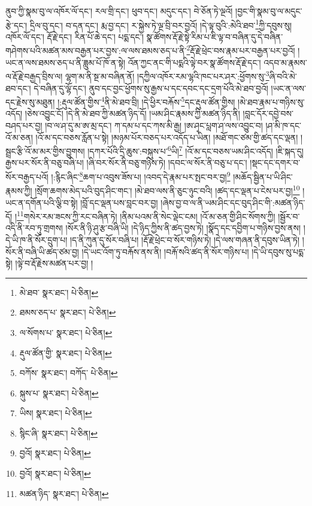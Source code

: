 ནུབ་ཀྱི་སྣམ་བུ་ལ་འཁོར་ལོ་དང་། རལ་གྲི་དང་། ཕུབ་དང་། མདུང་དང་། བེ་ཅོན་ཏེ་ལྔའོ། །བྱང་གི་སྣམ་བུ་ལ་མདུང་རྩེ་དང་། དྲིལ་བུ་དང་། བ་དན་དང་། རྨ་བྱ་དང་། ར་སྐྱེས་ཏེ་ལྔ་བྲི་བར་བྱའོ། །དེ་ལྟ་བུའི་:མེའི་ཐབ་\footnote{མེ་ཐབ་  སྣར་ཐང་།  པེ་ཅིན། }ཀྱི་དབུས་སུ། འཁོར་ལོ་དང་། རྡོ་རྗེ་དང་། རིན་པོ་ཆེ་དང་། པདྨ་དང་། སྣ་ཚོགས་རྡོ་རྗེ་སྟེ་རིམ་པ་ཇི་ལྟ་བ་བཞིན་དུ་དེ་བཞིན་གཤེགས་པའི་མཚན་མས་བརྒྱན་པར་བྱས་:ལ་ལས་ཐམས་ཅད་པ་ནི་\footnote{ཐམས་ཅད་པ་  སྣར་ཐང་།  པེ་ཅིན། }རྡོ་རྗེ་ཕྲེང་བས་རྣམ་པར་བརྒྱན་པར་བྱའོ། །ཡང་ན་ལས་ཐམས་ཅད་པ་ནི་ཟླུམ་པོ་ཁོ་ན་སྟེ། འོན་ཀྱང་ནང་གི་པདྨའི་ལྟེ་བར་སྣ་ཚོགས་རྡོ་རྗེ་དང་། འདབ་མ་རྣམས་ལ་རྡོ་རྗེ་བརྒྱད་བྲིས་ལ། ལྷག་མ་ནི་སྔ་མ་བཞིན་ནོ། །དཀྱིལ་འཁོར་རམ་ལྷའི་ཁང་པར་ཤར་:ཕྱོགས་སུ་\footnote{ལ་སོགས་པ་  སྣར་ཐང་།  པེ་ཅིན། }ཞི་བའི་མེ་ཐབ་དང་། དེ་བཞིན་དུ་ལྷོ་དང་། ནུབ་དང་བྱང་ཕྱོགས་སུ་རྒྱས་པ་དང་དབང་དང་དྲག་པོའི་མེ་ཐབ་བྱའོ། །ཡང་ན་ལས་དང་རྗེས་སུ་མཐུན། །:རྡུལ་ཚོན་གྱིས་\footnote{རྡུལ་ཚོན་གྱི་  སྣར་ཐང་།  པེ་ཅིན། }ནི་མེ་ཐབ་བྲི། །དེ་ཕྱིར་བརྐོས་\footnote{བཀོས་  སྣར་ཐང་། བཀོད་  པེ་ཅིན། }དང་རྡུལ་ཚོན་གྱིས། །མེ་ཐབ་རྣམ་པ་གཉིས་སུ་འདོད། །ཅེས་འབྱུང་ངོ། །དེ་ནི་མེ་ཐབ་ཀྱི་མཚན་ཉིད་དོ། །ཡམ་ཤིང་རྣམས་ཀྱི་མཚན་ཉིད་ནི། །བླང་དོར་དབྱེ་བས་བཤད་པར་བྱ། །བ་ལ་ཤ་དུ་མ་ཨ་མྲ་དང་། ཀ་དམ་པ་དང་ཀས་མི་རྒྱ། །ཨ་ཤྭང་པླག་ཤ་ལས་འབྱུང་བ། །ཤ་མི་ཁ་དང་འོ་མ་ཅན། །འོ་མ་དང་བཅས་རློན་པ་སྟེ། །མཉམ་པོར་བཅད་པར་འདོད་པ་ཡིན། །མཐོ་གང་ཙམ་གྱི་ཚད་དང་ལྡན། །སྦྲང་རྩི་འོ་མ་མར་གྱིས་བྱུགས། །དཀར་པོའི་དྲི་ཆུས་:བསྐུས་པ་\footnote{སྐུས་པ་  སྣར་ཐང་།  པེ་ཅིན། }ཡི།\footnote{ཡིས།  སྣར་ཐང་།  པེ་ཅིན། } །འོ་མ་དང་བཅས་ཡམ་ཤིང་འདོད། །ཇི་སྐད་དུ། རྒྱས་པར་སོར་ནི་བཅུ་བཞི་པ། །ཞི་བར་སོར་ནི་བཅུ་གཉིས་ཏེ། །དབང་ལ་སོར་ནི་བཅུ་པ་དང་། །སྡང་དང་དགར་བ་སོར་བརྒྱད་པའོ། །:རྙིང་ཞིང་\footnote{སྙིང་ཞི་  སྣར་ཐང་།  པེ་ཅིན། }ཆག་པ་འབུས་ཟོས་པ། །འབད་དེ་རྣམ་པར་སྤང་བར་བྱ།\footnote{བྱའོ།  སྣར་ཐང་།  པེ་ཅིན། } །མཆོད་སྦྱིན་པ་ཡི་ཤིང་རྣམས་ཀྱི། །སྲོག་ཆགས་མེད་པའི་བུད་ཤིང་གང་། །མེ་ཐབ་ལས་ནི་ཅུང་ཉུང་བའི། །ཚད་དང་ལྡན་པ་ངེས་པར་བྱ།\footnote{བྱའོ།  སྣར་ཐང་།  པེ་ཅིན། } །ཡང་ན་དགོན་པའི་ལྕི་བ་སྟེ། །བློ་དང་ལྡན་པས་བླང་བར་བྱ། །ཞེས་བྱ་བ་ལ་ནི་ཡམ་ཤིང་དང་བུད་ཤིང་གི་:མཚན་ཉིད་དོ། །\footnote{མཚན་ཉིད་  སྣར་ཐང་།  པེ་ཅིན། }གསེར་རམ་ཟངས་ཀྱི་རང་བཞིན་ཏེ། །ནིམ་པའམ་ནི་སེང་ལྡེང་ངམ། །འོ་མ་ཅན་གྱི་ཤིང་སོགས་ཀྱི། །སྦྱོར་བ་འདི་ནི་རབ་ཏུ་གྲགས། །སོར་ནི་ཉི་ཤུ་རྩ་བཞི་ཡི། །དེ་ཉིད་ཀྱིས་ནི་ཚད་བྱས་ཏེ། །སྣོད་དང་དབྱིག་པ་གཉིས་བྱས་ནས། །དེ་ཡི་ཁ་ནི་སོར་དྲུག་པ། །ད་ནི་ཀུན་དུ་སོར་བཞི་པ། །རྡོ་རྗེ་ཕྲེང་བ་སོར་གཉིས་ཏེ། །དེ་ལས་གཞན་ནི་དབུས་ཡིན་ཏེ། །སོར་ནི་བཞི་ཡི་ཚད་ཙམ་བྱ། །དེ་ཡང་འོག་ཏུ་བརྐོས་ནས་ནི། །བརྐོ་སའི་ཚད་ནི་སོར་གཉིས་པ། །དེ་ཡི་དབུས་སུ་པདྨ་སྟེ། །ལྟེ་བ་རྡོ་རྗེས་མཚན་པར་བྱ། །
